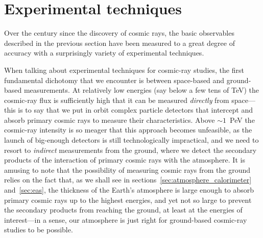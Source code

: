 \section{Experimental techniques}
\label{sec:cr_exp_techniques}

Over the century since the discovery of cosmic rays, the basic observables described
in the previous section have been measured to a great degree of accuracy with
a surprisingly variety of experimental techniques.

\begin{marginfigure}
  \begin{center}
  \end{center}
  \caption{Basic sketch of the fundamental dichotomy (space- vs. ground-based) of
    experimental techniques for cosmic-ray studies.}
\end{marginfigure}

When talking about experimental techniques for cosmic-ray studies, the first
fundamental dichotomy that we encounter is between space-based and ground-based
measurements. At relatively low energies (say below a few tens of TeV) the
cosmic-ray flux is sufficiently high that it can be measured \emph{directly}
from space---this is to say that we put in orbit complex particle detectors that
intercept and absorb primary cosmic rays to measure their characteristics.
Above $\sim 1$~PeV the cosmic-ray intensity is so meager that this approach
becomes unfeasible, as the launch of big-enough detectors is still technologically
impractical, and we need to resort to \emph{indirect}
measurements from the ground, where we detect the secondary products of the interaction
of primary cosmic rays with the atmosphere. It is amusing to note that the possibility
of measuring cosmic rays from the ground relies on the fact that, as we shall see
in sections~\ref{sec:atmosphere_calorimeter} and~\ref{sec:eas}, the thickness of
the Earth's atmosphere is large enough to absorb primary cosmic rays up to the highest
energies, and yet not so large to prevent the secondary products from reaching the
ground, at least at the energies of interest---in a sense, our atmosphere is just
right for ground-based cosmic-ray studies to be possible.

